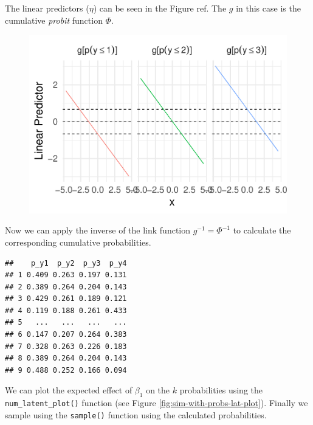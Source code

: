 \documentclass[
  man,floatsintext]{apa6}
\begin{document}
\scriptsize

\normalsize

The linear predictors (\(\eta\)) can be seen in the Figure ref. The \(g\) in this case is the cumulative \emph{probit} function \(\Phi\).

\scriptsize

\begin{figure}

{\centering \includegraphics{paper-new_files/figure-latex/unnamed-chunk-8-1} 

}

\caption{ }\label{fig:unnamed-chunk-8}
\end{figure}

\normalsize

Now we can apply the inverse of the link function \(g^{-1} = \Phi^{-1}\) to calculate the corresponding cumulative probabilities.

\scriptsize

\normalsize

\scriptsize

\begin{verbatim}
##    p_y1  p_y2  p_y3  p_y4
## 1 0.409 0.263 0.197 0.131
## 2 0.389 0.264 0.204 0.143
## 3 0.429 0.261 0.189 0.121
## 4 0.119 0.188 0.261 0.433
## 5   ...   ...   ...   ...
## 6 0.147 0.207 0.264 0.383
## 7 0.328 0.263 0.226 0.183
## 8 0.389 0.264 0.204 0.143
## 9 0.488 0.252 0.166 0.094
\end{verbatim}

\normalsize

We can plot the expected effect of \(\beta_1\) on the \(k\) probabilities using the \texttt{num\_latent\_plot()} function (see Figure \ref{fig:sim-with-probs-lat-plot}). Finally we sample using the \texttt{sample()} function using the calculated probabilities.
\end{document}
